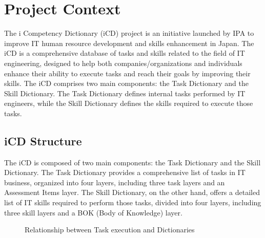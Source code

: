 
\section{Project Context}
The i Competency Dictionary (iCD) project is an initiative launched by IPA to improve IT human resource development and skills enhancement in Japan. The iCD is a comprehensive database of tasks and skills related to the field of IT engineering, designed to help both companies/organizations and individuals enhance their ability to execute tasks and reach their goals by improving their skills. The iCD comprises two main components: the Task Dictionary and the Skill Dictionary. The Task Dictionary defines internal tasks performed by IT engineers, while the Skill Dictionary defines the skills required to execute those tasks.

\newpage
\subsection{iCD Structure}
The iCD is composed of two main components: the Task Dictionary and the Skill Dictionary. The Task Dictionary provides a comprehensive list of tasks in IT business, organized into four layers, including three task layers and an Assessment Items layer. The Skill Dictionary, on the other hand, offers a detailed list of IT skills required to perform those tasks, divided into four layers, including three skill layers and a BOK (Body of Knowledge) layer.

\begin{figure}[H]
    \centering
    \caption{ Relationship between Task execution and Dictionaries}
    \label{fig:task_dictionaries_Relationship}
\end{figure}

